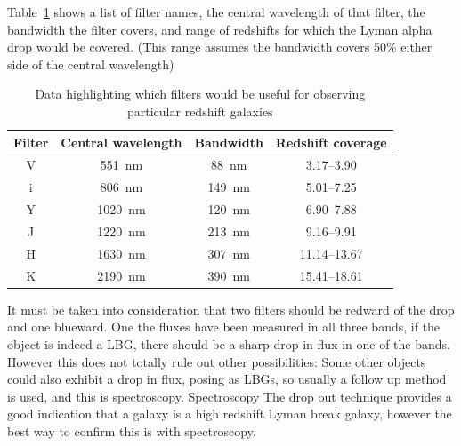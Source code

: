 			Table~\ref{tab:filter_characteristics} shows a list of filter names, the central wavelength of that filter, the bandwidth the filter covers, and range of redshifts for which the Lyman alpha drop would be covered. (This  range assumes the bandwidth covers 50\% either side of the central wavelength)
			\begin{table}[htbp]
				\begin{center}
					\begin{tabular}{c|c|c|c}
						Filter 	& Central wavelength & Bandwidth & Redshift coverage \\
						\hline \hline
						V 	& \SI{551}{\nano\metre}	 & \SI{88}{\nano\metre} & 3.17--3.90 \\
						i 	& \SI{806}{\nano\metre}	 & \SI{149}{\nano\metre} & 5.01--7.25 \\
						Y 	& \SI{1020}{\nano\metre} & \SI{120}{\nano\metre} & 6.90--7.88 \\
						J 	& \SI{1220}{\nano\metre} & \SI{213}{\nano\metre} & 9.16--9.91 \\
						H 	& \SI{1630}{\nano\metre} & \SI{307}{\nano\metre} & 11.14--13.67 \\
						K 	& \SI{2190}{\nano\metre} & \SI{390}{\nano\metre} & 15.41--18.61
					\end{tabular}
				\end{center}
				\caption{Data highlighting which filters would be useful for observing particular redshift galaxies\cite{Galactic_Astronomy_Binney_Merrifield}}
				\label{tab:filter_characteristics}
			\end{table}

			It must be taken into consideration that two filters should be redward of the drop and one blueward. One the fluxes have been measured in all three bands, if the object is indeed a LBG, there should be a sharp drop in flux in  one of the bands. However this does not totally rule out other possibilities: Some other objects could also exhibit a drop in flux, posing as LBGs, so usually a follow up method is used, and this is spectroscopy. Spectroscopy The drop out technique provides a good indication that a galaxy is a high redshift Lyman break galaxy, however the best way to confirm this is with spectroscopy.


